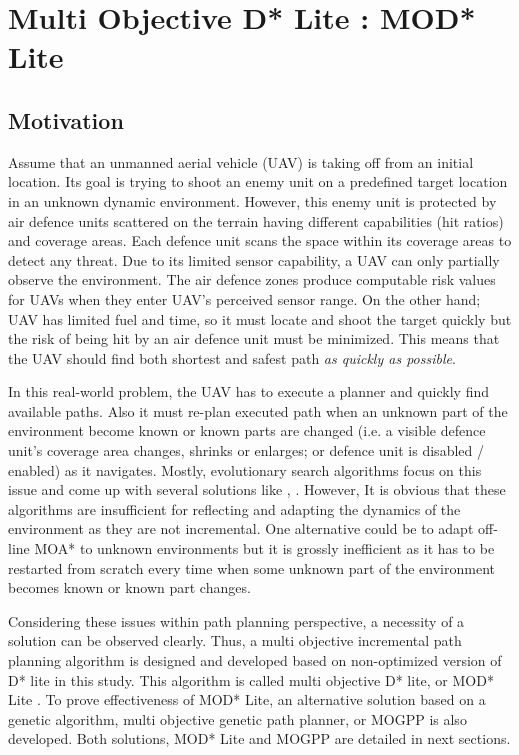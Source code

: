 \section{Multi Objective D*  Lite : MOD* Lite}
\label{chapter:proposedAlgorithm}

\subsection{Motivation}
Assume that an unmanned aerial vehicle (UAV) is taking off from an initial location. Its goal is trying to shoot an enemy unit on a predefined target location in an unknown dynamic environment. However, this enemy unit is protected by air defence units scattered on the terrain having different capabilities (hit ratios) and coverage areas. Each defence unit scans the space within its coverage areas to detect any threat. Due to its limited sensor capability, a UAV can only partially observe the environment. The air defence zones produce computable risk values for UAVs when they enter UAV's perceived sensor range. On the other hand; UAV has limited fuel and time, so it must locate and shoot the target quickly but the risk of being hit by an air defence unit must be minimized. This means that the UAV should find both shortest and safest path \textit{as quickly as possible}.

In this real-world problem, the UAV has to execute a planner and quickly find available paths. Also it must re-plan executed path when an unknown part of the environment become known or known parts are changed (i.e. a visible defence unit's coverage area changes, shrinks or enlarges; or defence unit is disabled / enabled) as it navigates. Mostly, evolutionary search algorithms focus on this issue and come up with several solutions like \cite{Peng_Xu_Zhang:2011}, \cite{Foo_Knutzon:2009}. However, It is obvious that these algorithms are insufficient for reflecting and adapting the dynamics of the environment as they are not incremental. One alternative could be to adapt off-line MOA* to unknown environments but it is grossly inefficient as it has to be restarted from scratch every time when some unknown part of the environment becomes known or known part changes.

Considering these issues within path planning perspective, a necessity of a solution can be observed clearly. Thus, a multi objective incremental path planning algorithm is designed and developed based on non-optimized version of D* lite \cite{Koenig:2002} in this study. This algorithm is called multi objective D* lite, or MOD* Lite \cite{Oral:2012}. To prove effectiveness of MOD* Lite,  an alternative solution based on a genetic algorithm, multi objective genetic path planner, or MOGPP is also developed. Both solutions, MOD* Lite and MOGPP are detailed in next sections.

